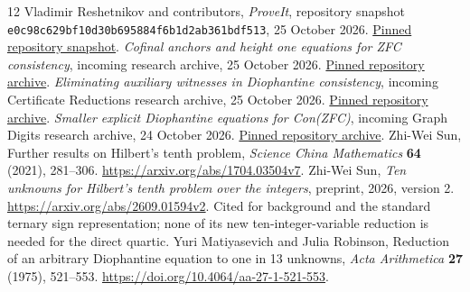 \documentclass[11pt,letterpaper]{article}
\theoremstyle{definition}\newtheorem{definition}[theorem]{Definition}
\theoremstyle{remark}\newtheorem{remark}[theorem]{Remark}
\begin{document}
\begin{thebibliography}{12}
 Vladimir Reshetnikov and contributors, \emph{ProveIt}, repository snapshot \texttt{e0c98c629bf10d30b695884f6b1d2ab361bdf513}, 25 October 2026. \href{https://github.com/VladimirReshetnikov/ProveIt/tree/e0c98c629bf10d30b695884f6b1d2ab361bdf513}{Pinned repository snapshot}.
 \emph{Cofinal anchors and height one equations for ZFC consistency}, incoming research archive, 25 October 2026. \href{https://github.com/VladimirReshetnikov/ProveIt/blob/e0c98c629bf10d30b695884f6b1d2ab361bdf513/docs/incoming/ConZFC_Cofinal_Anchors_Height_One_Round17_2026-10-25.zip}{Pinned repository archive}.
 \emph{Eliminating auxiliary witnesses in Diophantine consistency}, incoming Certificate Reductions research archive, 25 October 2026. \href{https://github.com/VladimirReshetnikov/ProveIt/blob/e0c98c629bf10d30b695884f6b1d2ab361bdf513/docs/incoming/ConZFC_Certificate_Reductions_2026-10-25.zip}{Pinned repository archive}.
 \emph{Smaller explicit Diophantine equations for Con(ZFC)}, incoming Graph Digits research archive, 24 October 2026. \href{https://github.com/VladimirReshetnikov/ProveIt/blob/e0c98c629bf10d30b695884f6b1d2ab361bdf513/docs/incoming/conzfc_graph_digits_2026-10-24.zip}{Pinned repository archive}.
 Zhi-Wei Sun, Further results on Hilbert's tenth problem, \emph{Science China Mathematics} \textbf{64} (2021), 281--306. \url{https://arxiv.org/abs/1704.03504v7}.
 Zhi-Wei Sun, \emph{Ten unknowns for Hilbert's tenth problem over the integers}, preprint, 2026, version 2. \url{https://arxiv.org/abs/2609.01594v2}. Cited for background and the standard ternary sign representation; none of its new ten-integer-variable reduction is needed for the direct quartic.
 Yuri Matiyasevich and Julia Robinson, Reduction of an arbitrary Diophantine equation to one in 13 unknowns, \emph{Acta Arithmetica} \textbf{27} (1975), 521--553. \url{https://doi.org/10.4064/aa-27-1-521-553}.
\end{thebibliography}
\end{document}
